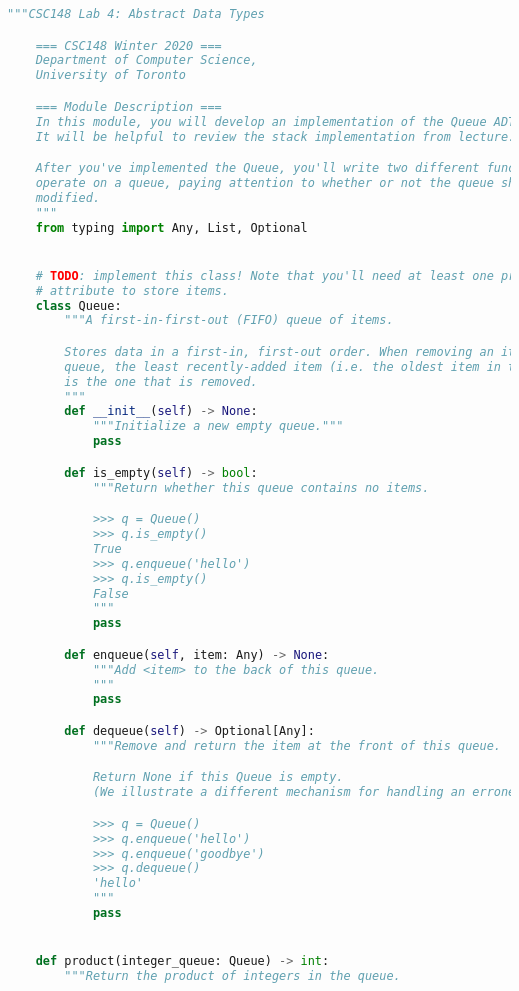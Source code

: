 \documentclass[12pt]{article}
\begin{document}
\begin{lstlisting}[language=Python,caption={myqueue.py},captionpos=b]
    """CSC148 Lab 4: Abstract Data Types

    === CSC148 Winter 2020 ===
    Department of Computer Science,
    University of Toronto

    === Module Description ===
    In this module, you will develop an implementation of the Queue ADT.
    It will be helpful to review the stack implementation from lecture.

    After you've implemented the Queue, you'll write two different functions that
    operate on a queue, paying attention to whether or not the queue should be
    modified.
    """
    from typing import Any, List, Optional


    # TODO: implement this class! Note that you'll need at least one private
    # attribute to store items.
    class Queue:
        """A first-in-first-out (FIFO) queue of items.

        Stores data in a first-in, first-out order. When removing an item from the
        queue, the least recently-added item (i.e. the oldest item in the Queue)
        is the one that is removed.
        """
        def __init__(self) -> None:
            """Initialize a new empty queue."""
            pass

        def is_empty(self) -> bool:
            """Return whether this queue contains no items.

            >>> q = Queue()
            >>> q.is_empty()
            True
            >>> q.enqueue('hello')
            >>> q.is_empty()
            False
            """
            pass

        def enqueue(self, item: Any) -> None:
            """Add <item> to the back of this queue.
            """
            pass

        def dequeue(self) -> Optional[Any]:
            """Remove and return the item at the front of this queue.

            Return None if this Queue is empty.
            (We illustrate a different mechanism for handling an erroneous case.)

            >>> q = Queue()
            >>> q.enqueue('hello')
            >>> q.enqueue('goodbye')
            >>> q.dequeue()
            'hello'
            """
            pass


    def product(integer_queue: Queue) -> int:
        """Return the product of integers in the queue.


\end{lstlisting}
\end{document}
